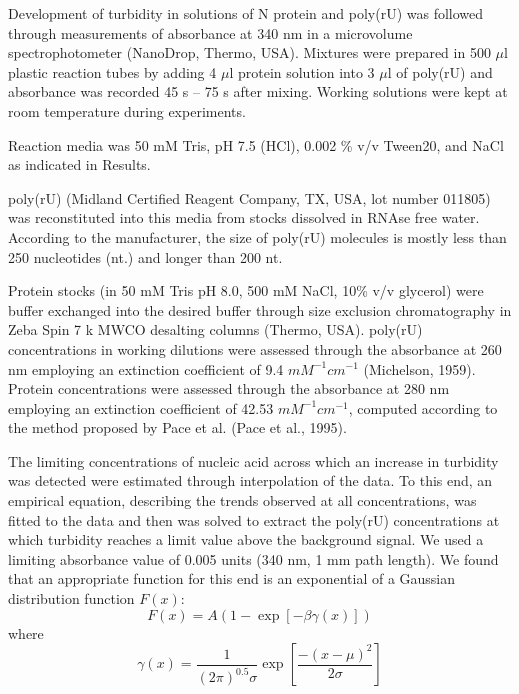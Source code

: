 \documentclass[../main.tex]{subfiles}
\begin{document}
        Development of turbidity in solutions of N protein and poly(rU) was followed through measurements of absorbance at 340 nm in a microvolume spectrophotometer (NanoDrop, Thermo, USA). Mixtures were prepared in 500 $\mu$l plastic reaction tubes by adding 4 $\mu$l protein solution into 3 $\mu$l of poly(rU) and absorbance was recorded 45 s – 75 s after mixing. Working solutions were kept at room temperature during experiments.

        Reaction media was 50 mM Tris, pH 7.5 (HCl), 0.002 \% v/v Tween20, and NaCl as indicated in Results.

        poly(rU) (Midland Certified Reagent Company, TX, USA, lot number 011805) was reconstituted into this media from stocks dissolved in RNAse free water. According to the manufacturer, the size of poly(rU) molecules is mostly less than 250 nucleotides (nt.) and longer than 200 nt. 

        Protein stocks (in 50 mM Tris pH 8.0, 500 mM NaCl, 10\% v/v glycerol) were buffer exchanged into the desired buffer through size exclusion chromatography in Zeba Spin 7 k MWCO desalting columns (Thermo, USA). poly(rU) concentrations in working dilutions were assessed through the absorbance at 260 nm employing an extinction coefficient of 9.4 $mM^{-1}cm^{-1}$ (Michelson, 1959). Protein concentrations were assessed through the absorbance at 280 nm employing an extinction coefficient of 42.53 $mM^{-1}cm^{-1}$, computed according to the method proposed by Pace et al. (Pace et al., 1995).

        The limiting concentrations of nucleic acid across which an increase in turbidity was detected were estimated through interpolation of the data. To this end, an empirical equation, describing the trends observed at all concentrations, was fitted to the data and then was solved to extract the poly(rU) concentrations at which turbidity reaches a limit value above the background signal. We used a limiting absorbance value of 0.005 units (340 nm, 1 mm path length). We found that an appropriate function for this end is an exponential of a Gaussian distribution function $F(x)$:
        \begin{equation}\label{appendix-e-eq23}
            F(x) = A(1-\exp[-\beta\gamma(x)])
        \end{equation}
        where
        \begin{equation}\label{appendix-e-eq24}
            \gamma(x)=\frac{1}{(2\pi)^{0.5}\sigma}\exp{[\frac{-(x-\mu)^2}{2\sigma}]}
        \end{equation}
\end{document}
